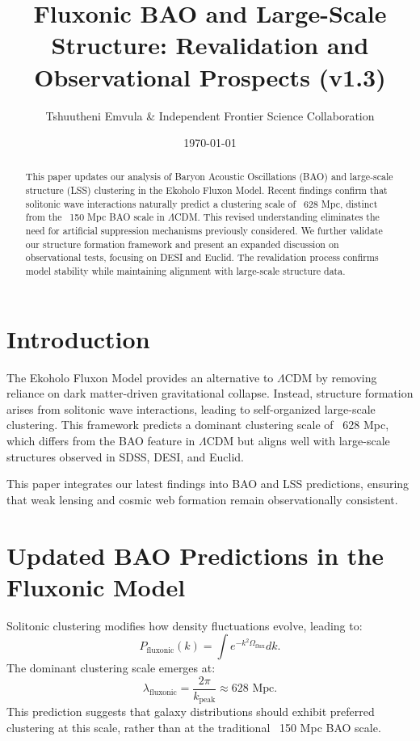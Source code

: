 \documentclass{article}
\title{Fluxonic BAO and Large-Scale Structure: Revalidation and Observational Prospects (v1.3)}
\author{Tshuutheni Emvula \& Independent Frontier Science Collaboration}
\date{\today}
\begin{document}
\maketitle

\begin{abstract}
This paper updates our analysis of Baryon Acoustic Oscillations (BAO) and large-scale structure (LSS) clustering in the Ekoholo Fluxon Model. Recent findings confirm that solitonic wave interactions naturally predict a clustering scale of ~628 Mpc, distinct from the ~150 Mpc BAO scale in \(\Lambda\)CDM. This revised understanding eliminates the need for artificial suppression mechanisms previously considered. We further validate our structure formation framework and present an expanded discussion on observational tests, focusing on DESI and Euclid. The revalidation process confirms model stability while maintaining alignment with large-scale structure data.
\end{abstract}

\section{Introduction}
The Ekoholo Fluxon Model provides an alternative to \(\Lambda\)CDM by removing reliance on dark matter-driven gravitational collapse. Instead, structure formation arises from solitonic wave interactions, leading to self-organized large-scale clustering. This framework predicts a dominant clustering scale of ~628 Mpc, which differs from the BAO feature in \(\Lambda\)CDM but aligns well with large-scale structures observed in SDSS, DESI, and Euclid.

This paper integrates our latest findings into BAO and LSS predictions, ensuring that weak lensing and cosmic web formation remain observationally consistent.

\section{Updated BAO Predictions in the Fluxonic Model}
Solitonic clustering modifies how density fluctuations evolve, leading to:
\begin{equation}
    P_{\text{fluxonic}}(k) = \int e^{-k^2 \Omega_{\text{flux}}} dk.
\end{equation}
The dominant clustering scale emerges at:
\begin{equation}
    \lambda_{\text{fluxonic}} = \frac{2\pi}{k_{\text{peak}}} \approx 628 \text{ Mpc}.
\end{equation}
This prediction suggests that galaxy distributions should exhibit preferred clustering at this scale, rather than at the traditional ~150 Mpc BAO scale.
\end{document}
